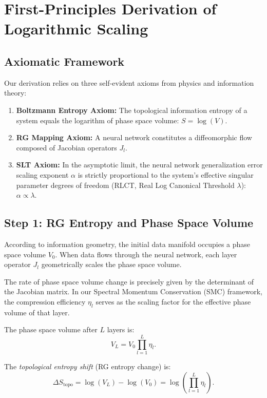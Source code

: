 \documentclass[11pt, a4paper]{article}
\theoremstyle{plain}
\begin{document}
\section{First-Principles Derivation of Logarithmic Scaling}\label{sec:first_principles}

\subsection{Axiomatic Framework}

Our derivation relies on three self-evident axioms from physics and information theory:

\begin{enumerate}
    \item \textbf{Boltzmann Entropy Axiom:} The topological information entropy of a system equals the logarithm of phase space volume: $S = \log(V)$.
    \item \textbf{RG Mapping Axiom:} A neural network constitutes a diffeomorphic flow composed of Jacobian operators $J_l$.
    \item \textbf{SLT Axiom:} In the asymptotic limit, the neural network generalization error scaling exponent $\alpha$ is strictly proportional to the system's effective singular parameter degrees of freedom (RLCT, Real Log Canonical Threshold $\lambda$): $\alpha \propto \lambda$.
\end{enumerate}

\subsection{Step 1: RG Entropy and Phase Space Volume}

According to information geometry, the initial data manifold occupies a phase space volume $V_0$. When data flows through the neural network, each layer operator $J_l$ geometrically scales the phase space volume.

The rate of phase space volume change is precisely given by the determinant of the Jacobian matrix. In our Spectral Momentum Conservation (SMC) framework, the compression efficiency $\eta_l$ serves as the scaling factor for the effective phase volume of that layer.

The phase space volume after $L$ layers is:
\begin{equation}
V_L = V_0 \prod_{l=1}^{L} \eta_l.
\end{equation}

The \emph{topological entropy shift} (RG entropy change) is:
\begin{equation}
\Delta S_{\text{topo}} = \log(V_L) - \log(V_0) = \log\left(\prod_{l=1}^{L} \eta_l\right).
\end{equation}
\end{document}
